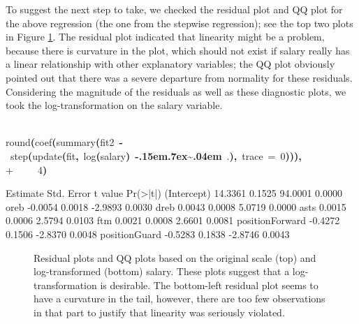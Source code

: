 \documentclass[english]{article}
\newenvironment{dummy}{\par}{\par}
\newcommand{\hlnumber}[1]{\textcolor[rgb]{0.0823529411764706,0.0784313725490196,0.709803921568627}{#1}}%
\newcommand{\hlfunctioncall}[1]{\textcolor[rgb]{1,0,0}{#1}}%
\newcommand{\hlkeyword}[1]{\textcolor[rgb]{0,0,0}{\textbf{#1}}}%
\newcommand{\hlargument}[1]{\textcolor[rgb]{0.694117647058824,0.247058823529412,0.0196078431372549}{#1}}%
\newcommand{\hlassignement}[1]{\textcolor[rgb]{0.215686274509804,0.215686274509804,0.384313725490196}{\textbf{#1}}}%
\newcommand{\hlsymbol}[1]{\textcolor[rgb]{0,0,0}{#1}}%
\newcommand{\hlprompt}[1]{\textcolor[rgb]{0,0,0}{#1}}%
\def\urltilda{\kern -.15em\lower .7ex\hbox{\~{}}\kern .04em}%
\newcommand{\hlstd}[1]{\textcolor[rgb]{0,0,0}{#1}}%
\begin{document}
To suggest the next step to take, we checked the residual plot and
QQ plot for the above regression (the one from the stepwise regression);
see the top two plots in Figure \ref{fig:residual-plot}. The residual
plot indicated that linearity might be a problem, because there is
curvature in the plot, which should not exist if salary really has
a linear relationship with other explanatory variables; the QQ plot
obviously pointed out that there was a severe departure from normality
for these residuals. Considering the magnitude of the residuals as
well as these diagnostic plots, we took the log-transformation on
the salary variable.
\begin{dummy}
\hspace*{\fill}\\
\hlstd{}\ttfamily\noindent
\hlprompt{\usebox{\hlnormalsizeboxgreaterthan}{\ }}\hlfunctioncall{round}\hlkeyword{(}\hlfunctioncall{coef}\hlkeyword{(}\hlfunctioncall{summary}\hlkeyword{(}\hlsymbol{fit2}{\ }\hlassignement{\usebox{\hlnormalsizeboxlessthan}-}{\ }\hlfunctioncall{step}\hlkeyword{(}\hlfunctioncall{update}\hlkeyword{(}\hlsymbol{fit}\hlkeyword{,}{\ }\hlfunctioncall{log}\hlkeyword{(}\hlsymbol{salary}\hlkeyword{)}{\ }\hlkeyword{\urltilda{}}{\ }\hlsymbol{.}\hlkeyword{)}\hlkeyword{,}{\ }\hlargument{trace}{\ }\hlargument{=}{\ }\hlnumber{0}\hlkeyword{)}\hlkeyword{)}\hlkeyword{)}\hlkeyword{,}\hspace*{\fill}\\
\hlstd{}\hlprompt{+{\ }}{\ }{\ }{\ }{\ }\hlnumber{4}\hlkeyword{)}\mbox{}
\normalfont
\hspace*{\fill}\\
\hlstd{}\begin{Schunk}
\begin{Soutput}
                Estimate Std. Error t value Pr(>|t|)
(Intercept)      14.3361     0.1525 94.0001   0.0000
oreb             -0.0054     0.0018 -2.9893   0.0030
dreb              0.0043     0.0008  5.0719   0.0000
asts              0.0015     0.0006  2.5794   0.0103
ftm               0.0021     0.0008  2.6601   0.0081
positionForward  -0.4272     0.1506 -2.8370   0.0048
positionGuard    -0.5283     0.1838 -2.8746   0.0043
\end{Soutput}

\end{Schunk}
\end{dummy}
%
\begin{figure}
\begin{dummy}

\begin{center}


\endpgfgraphicnamed
\end{center}
\end{dummy}
\caption{Residual plots and QQ plots based on the original scale (top) and
log-transformed (bottom) salary. These plots suggest that a log-transformation
is desirable. The bottom-left residual plot seems to have a curvature
in the tail, however, there are too few observations in that part
to justify that linearity was seriously violated.\label{fig:residual-plot}}

\end{figure}
\end{document}
